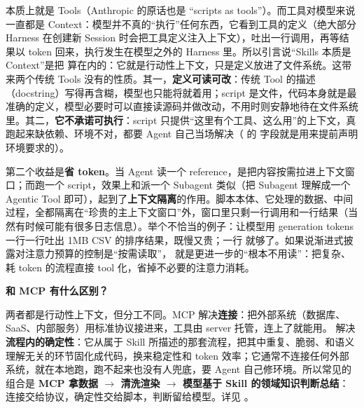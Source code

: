  本质上就是 Tools（Anthropic 的原话也是 “scripts as tools”）。而工具对模型来说一直都是 Context：模型并不真的“执行”任何东西，它看到工具的定义（绝大部分 Harness 在创建新 Session 时会把工具定义注入上下文），吐出一行调用，再等结果以 token 回来，执行发生在模型之外的 Harness 里。所以引言说“Skills 本质是 Context”是把  算在内的：它就是行动性上下文，只是定义放进了文件系统。这带来两个传统 Tools 没有的性质。其一，\textbf{定义可读可改}：传统 Tool 的描述（docstring）写得再含糊，模型也只能将就着用；script 是文件，代码本身就是最准确的定义，模型必要时可以直接读源码并做改动，不用时则安静地待在文件系统里。其二，\textbf{它不承诺可执行}：script 只提供“这里有个工具、这么用”的上下文，真跑起来缺依赖、环境不对，都要 Agent 自己当场解决（ 的  字段就是用来提前声明环境要求的）。


第二个收益是\textbf{省 token}。当 Agent 读一个 reference，是把内容按需拉进上下文窗口；而跑一个 script，效果上和派一个 Subagent 类似（把 Subagent 理解成一个 Agentic Tool 即可），起到了\textbf{上下文隔离}的作用。脚本本体、它处理的数据、中间过程，全都隔离在“珍贵的主上下文窗口”外，窗口里只剩一行调用和一行结果（当然有时候可能有很多日志信息）。举个不恰当的例子：让模型用 generation tokens 一行一行吐出 1MB CSV 的排序结果，既慢又贵；一行  就够了。如果说渐进式披露对注意力预算的控制是“按需读取”， 就是更进一步的“根本不用读”：把复杂、耗 token 的流程直接 tool 化，省掉不必要的注意力消耗。

\textbf{ 和 MCP 有什么区别？}

两者都是行动性上下文，但分工不同。MCP 解决\textbf{连接}：把外部系统（数据库、SaaS、内部服务）用标准协议接进来，工具由 server 托管，连上了就能用。 解决\textbf{流程内的确定性}：它从属于 Skill 所描述的那套流程，把其中重复、脆弱、和语义理解无关的环节固化成代码，换来稳定性和 token 效率；它通常不连接任何外部系统，就在本地跑，跑不起来也没有人兜底，要 Agent 自己修环境。所以常见的组合是 \textbf{MCP 拿数据 $\to$  清洗渲染 $\to$ 模型基于 Skill 的领域知识判断总结}：连接交给协议，确定性交给脚本，判断留给模型。详见 。

